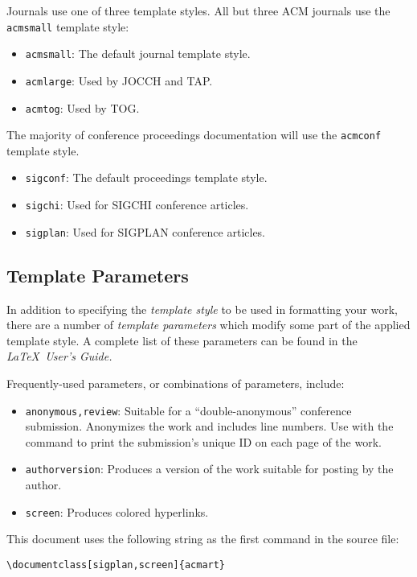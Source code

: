 \documentclass[sigplan,screen]{acmart}
\begin{document}
Journals use one of three template styles. All but three ACM journals
use the {\verb|acmsmall|} template style:
\begin{itemize}
\item {\texttt{acmsmall}}: The default journal template style.
\item {\texttt{acmlarge}}: Used by JOCCH and TAP.
\item {\texttt{acmtog}}: Used by TOG.
\end{itemize}

The majority of conference proceedings documentation will use the {\verb|acmconf|} template style.
\begin{itemize}
\item {\texttt{sigconf}}: The default proceedings template style.
\item{\texttt{sigchi}}: Used for SIGCHI conference articles.
\item{\texttt{sigplan}}: Used for SIGPLAN conference articles.
\end{itemize}

\subsection{Template Parameters}

In addition to specifying the {\itshape template style} to be used in
formatting your work, there are a number of {\itshape template parameters}
which modify some part of the applied template style. A complete list
of these parameters can be found in the {\itshape \LaTeX\ User's Guide.}

Frequently-used parameters, or combinations of parameters, include:
\begin{itemize}
\item {\texttt{anonymous,review}}: Suitable for a ``double-anonymous''
  conference submission. Anonymizes the work and includes line
  numbers. Use with the \texttt{\string\acmSubmissionID} command to print the
  submission's unique ID on each page of the work.
\item{\texttt{authorversion}}: Produces a version of the work suitable
  for posting by the author.
\item{\texttt{screen}}: Produces colored hyperlinks.
\end{itemize}

This document uses the following string as the first command in the
source file:
\begin{verbatim}
\documentclass[sigplan,screen]{acmart}
\end{verbatim}
\end{document}
